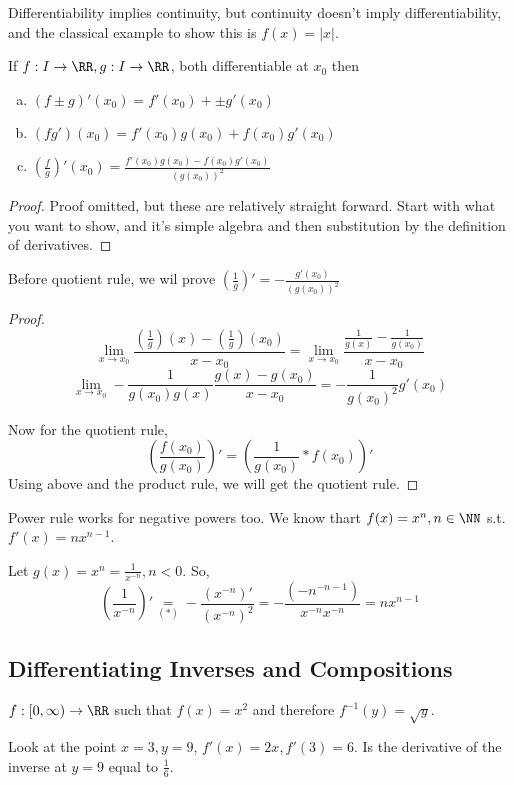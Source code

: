 \documentclass[12pt]{scrartcl}
\begin{document}
\begin{note}
  Differentiability implies continuity, but continuity doesn't imply differentiability, and the 
  classical example to show this is $f(x) = |x|$. 
\end{note}

\begin{theorem}
  If $f: I \to \RR, g: I \to \RR$, both differentiable at $x_0$ then 
  \begin{enumerate}[a.]
    \item $(f \pm g)'(x_0) = f'(x_0) +\pm g'(x_0)$
    \item $(fg')(x_0) = f'(x_0)g(x_0) + f(x_0)g'(x_0)$
    \item $(\frac{f}{g})'(x_0) = \frac{f'(x_0)g(x_0) - f(x_0)g'(x_0)}{(g(x_0))^2}$
  \end{enumerate}

  \begin{proof}
    Proof omitted, but these are relatively straight forward. Start with what you want
    to show, and it's simple algebra and then substitution by the definition of derivatives.
  \end{proof}
\end{theorem}

\begin{note}
  Before quotient rule, we wil prove $(\frac{1}{g})' = -\frac{g'(x_0)}{(g(x_0))^2}$
  \begin{proof}
    \[\lim_{x\to x_0} \dfrac{(\frac{1}{g})(x) - (\frac{1}{g})(x_0)}{x-x_0} = \lim_{x\to x_0 }\dfrac{\frac{1}{g(x)} -  \frac{1}{g(x_0)}}{x-x_0}\]
    \[\lim_{x\to x_0}-\frac{1}{g(x_0)g(x)}\frac{g(x) - g(x_0)}{x - x_0} = -\frac{1}{g(x_0)^2}g'(x_0)\]

    Now for the quotient rule, 
    \[(\frac{f(x_0)}{g(x_0)})' = (\frac{1}{g(x_0)} * f(x_0))'\]
    Using above and the product rule, we will get the quotient rule.
  \end{proof}
\end{note}

\begin{note}
  Power rule works for negative powers too. We know thart $f(x) = x^n, n \in \NN$ s.t. $f'(x) = nx^{n-1}$.

  Let $g(x) = x^n = \frac{1}{x^{-n}}, n < 0$. So, 
  \[(\frac{1}{x^{-n}})' \underset{(*)}{=} -\frac{(x^{-n})'}{(x^{-n})^2} = -\frac{(-n^{-n-1})}{x^{-n}x^{-n}} = nx^{n-1}\]
\end{note}

\subsection{Differentiating Inverses and Compositions}

\begin{example}
  $f: [0, \infty) \to \RR$ such that $f(x) = x^2$ and therefore $f^{-1}(y) = \sqrt{y}$.

  Look at the point $x=3, y=9$, $f'(x) = 2x, f'(3) = 6$. Is the derivative of the 
  inverse at $y=9$ equal to $\frac{1}{6}$.  
\end{example}
\end{document}
